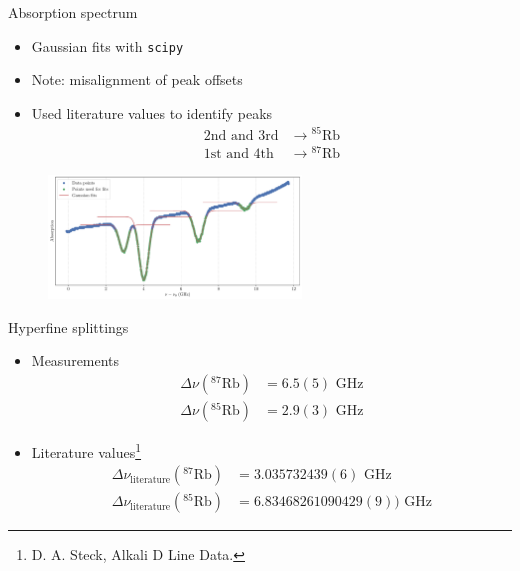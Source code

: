 \documentclass{../talk}
\begin{document}
\begin{frame}{Absorption spectrum}
  \begin{multicols}{2}
    \begin{itemize}
      \item<2-> Gaussian fits with {\tt scipy}
      \item<3-> Note: misalignment of peak offsets
      \columnbreak
      \item<4-> Used literature values to identify peaks
        \begin{align*}
          \text{2nd and 3rd} &\to {}^{85}\text{Rb} \\
          \text{1st and 4th} &\to {}^{87}\text{Rb}
        \end{align*}
        \vspace*{-1cm}
    \end{itemize}
  \end{multicols}
  \begin{figure}
    \centering
    \includegraphics[width=0.6\textwidth]{data/analysis.pdf}
    \caption{}
  \end{figure}
\end{frame}

\begin{frame}{Hyperfine splittings}
  \begin{itemize}
    \item Measurements
      \begin{align}
        \Delta\nu(^{87}\text{Rb}) &= 6.5(5) \text{ GHz} \\
        \Delta\nu(^{85}\text{Rb}) &= 2.9(3) \text{ GHz}
      \end{align}
    \item<2-> Literature values\footnote{D. A. Steck, Alkali D Line Data.}
      \begin{align}
        \Delta\nu_\text{literature}(^{87}\text{Rb}) &= 3.035732439(6) \text{ GHz} \\
        \Delta\nu_\text{literature}(^{85}\text{Rb}) &= 6.83468261090429(9)) \text{ GHz}
      \end{align}
  \end{itemize}
\end{frame}
\end{document}

